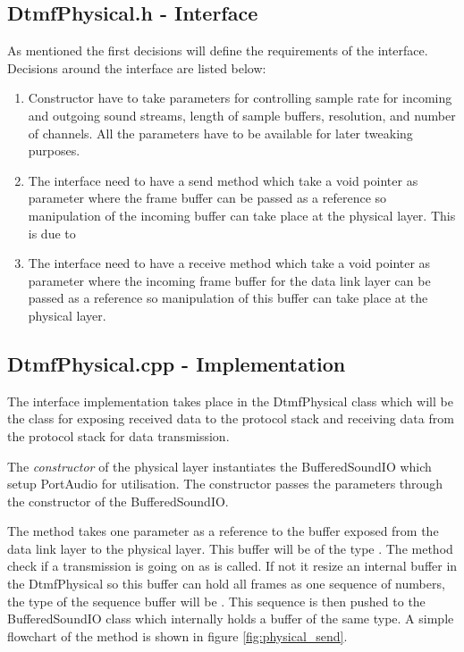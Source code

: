 	\subsection{DtmfPhysical.h - Interface}
	As mentioned the first decisions will define the requirements of the interface. Decisions around the interface are listed below:
	\begin {enumerate}
	\item Constructor have to take parameters for controlling sample rate for incoming and outgoing sound streams, length of sample buffers,
	resolution, and number of channels. All the parameters have to be available for later tweaking purposes.
	\item The interface need to have a send method which take a void pointer as parameter where the frame buffer can be passed as a reference
	so manipulation of the incoming buffer can take place at the physical layer. This is due to 
	\item The interface need to have a receive method which take a void pointer as parameter where the incoming frame buffer for the data link
	layer can be passed as a reference so manipulation of this buffer can take place at the physical layer.
	\end{enumerate}
	
	\subsection{DtmfPhysical.cpp - Implementation}
	The interface implementation takes place in the DtmfPhysical class which will be the class for exposing received data to the protocol stack
	and receiving data from the protocol stack for data transmission.
	
	The \textit{constructor} of the physical layer instantiates the BufferedSoundIO which setup PortAudio for utilisation. The constructor passes the
	parameters through the constructor of the BufferedSoundIO.
	
	The  method takes one parameter as a reference to the buffer exposed from the data link layer to the physical layer. This buffer
	will be of the type . The  method check if a transmission is going on as  is called.
	If not it resize an internal buffer in the DtmfPhysical so this buffer can hold all frames as one sequence of numbers, the type of 
	the sequence buffer will be . This sequence is then pushed to the BufferedSoundIO class which
	internally holds a buffer of the same type. A simple flowchart of the  method is shown in figure \ref{fig:physical_send}.
	
